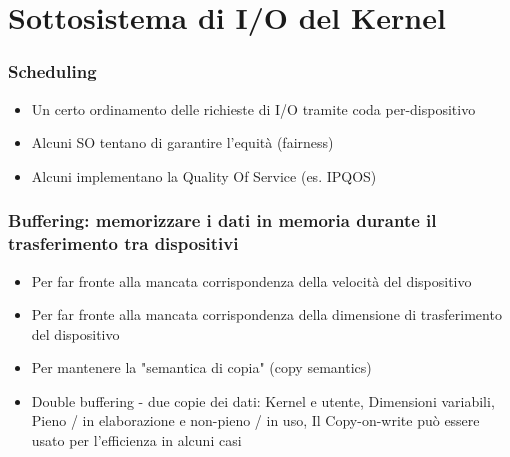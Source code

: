 \section{Sottosistema di I/O del Kernel}

\begin{flushleft}
  \begin{minipage}[t]{0.48\linewidth}
    \raggedright
    \subsubsection{Scheduling}
    \begin{itemize}
      \item Un certo ordinamento delle richieste di I/O tramite coda per-dispositivo
      \item Alcuni SO tentano di garantire l'equità (fairness)
      \item Alcuni implementano la Quality Of Service (es. IPQOS)
    \end{itemize}
  \end{minipage}%
  \hfill
  \begin{minipage}[t]{0.48\linewidth}
    \raggedright
    \subsubsection{Buffering: memorizzare i dati in memoria durante il trasferimento tra dispositivi}
    \begin{itemize}
      \item Per far fronte alla mancata corrispondenza della velocità del dispositivo
      \item Per far fronte alla mancata corrispondenza della dimensione di trasferimento del dispositivo
      \item Per mantenere la "semantica di copia" (copy semantics)
      \item Double buffering - due copie dei dati: Kernel e utente, Dimensioni variabili, Pieno / in elaborazione e non-pieno / in uso, Il Copy-on-write può essere usato per l'efficienza in alcuni casi
    \end{itemize}
  \end{minipage}
\end{flushleft}



